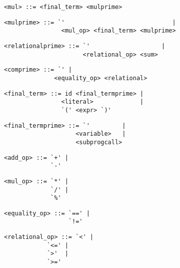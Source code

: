 \begin{footnotesize}
\begin{lstlisting}[frame=single, label={mul}, language=pie]
<mul> ::= <final_term> <mulprime>
\end{lstlisting}

\begin{lstlisting}[frame=single, label={mulprime}, language=pie]
<mulprime> ::= `'                              | 
                <mul_op> <final_term> <mulprime>
\end{lstlisting}

\begin{lstlisting}[frame=single, label={relationalprime}, language=pie]
<relationalprime> ::= `'                    | 
                      <relational_op> <sum>
\end{lstlisting}

\begin{lstlisting}[frame=single, label={comprime}, language=pie]
<comprime> ::= `' |
              <equality_op> <relational>
\end{lstlisting}

\begin{lstlisting}[frame=single, label={final_term}, language=pie]
<final_term> ::= id <final_termprime> | 
                <literal>             | 
                `(' <expr> `)'
\end{lstlisting}

\begin{lstlisting}[frame=single, label={final_termprime}, language=pie]
<final_termprime> ::= `'         | 
                    <variable>   | 
                    <subprogcall>  
\end{lstlisting}

\begin{lstlisting}[frame=single, label={add_op}, language=pie]
<add_op> ::= `+' | 
             `-'
\end{lstlisting}

\begin{lstlisting}[frame=single, label={mul_op}, language=pie]
<mul_op> ::= `*' | 
             `/' |
             `%'
\end{lstlisting}

\begin{lstlisting}[frame=single, label={equality_op}, language=pie]
<equality_op> ::= `==' | 
                  `!='
\end{lstlisting}

\begin{lstlisting}[frame=single, label={relational_op}, language=pie]
<relational_op> ::= `<' | 
	   	    `<=' |
		    `>'  |
		    `>='
\end{lstlisting}


\end{footnotesize}
